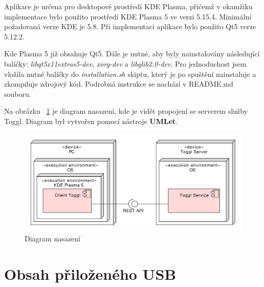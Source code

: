 \documentclass[thesis=B,czech]{FITthesis}[2012/06/26]
\begin{document}
Aplikace je určena pro desktopové prostředí KDE Plasma, přičemž v okamžiku implementace bylo použito prostředí KDE Plasma 5 ve verzi 5.15.4. Minimální požadovaná verze KDE je 5.8. Při implementaci aplikace bylo použito Qt5 verze 5.12.2. \par 
 Kde Plasma 5 již obsahuje Qt5. Dále je nutné, aby byly nainstalovány následující balíčky: \textit{libqt5x11extras5-dev},  \textit{xorg-dev} a \textit{libglib2.0-dev}. Pro jednoduchost jsem vložila nutné balíčky do \textit{installation.sh} skiptu, který je po spuštění nainstaluje a zkompiluje zdrojový kód. Podrobná instrukce se nachází v README.md souboru. \par
Na obrázku ~\ref{fig:comp_m} je diagram nasazení, kde je vidět propojení se serverem služby Toggl. Diagram byl vytvořen pomocí nástroje \textbf{UMLet}.

 \begin{figure}[h]\centering
	\includegraphics[width=1\textwidth]{comp_m2.pdf}
	\caption[Diagram nasazení]{Diagram nasazení}\label{fig:comp_m}
\end{figure}



\chapter{Obsah přiloženého USB}


\begin{figure}
\end{figure}
\end{document}
